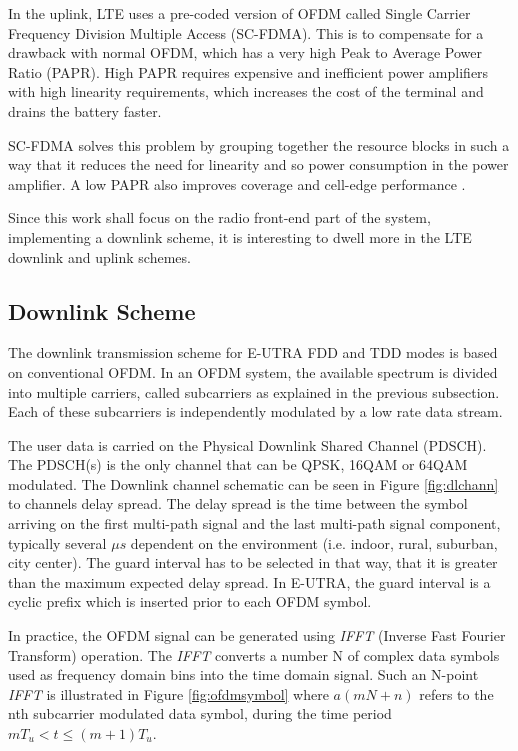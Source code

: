 
In the uplink, LTE uses a pre-coded version of OFDM called Single Carrier Frequency
Division Multiple Access (SC-FDMA). This is to compensate for a drawback with normal
OFDM, which has a very high Peak to Average Power Ratio (PAPR). High PAPR requires
expensive and inefficient power amplifiers with high linearity requirements, which
increases the cost of the terminal and drains the battery faster.

SC-FDMA solves this problem by grouping together the resource blocks in such a
way that it reduces the need for linearity and so power consumption in the
power amplifier. A low PAPR also improves coverage and cell-edge performance
\cite{introlte}.

Since this work shall focus on the radio front-end part of the system, implementing
a downlink scheme, it is interesting to dwell more in the LTE downlink and uplink
schemes.

\subsection{Downlink Scheme}%

The downlink transmission scheme for E-UTRA FDD and TDD modes is based on
conventional OFDM. In an OFDM system, the available spectrum is divided into
multiple carriers, called subcarriers as explained in the previous subsection.
Each of these subcarriers is independently modulated by a low rate data stream.

The user data is carried on the Physical Downlink Shared Channel (PDSCH). The
PDSCH(s) is the only channel that can be QPSK, 16QAM or 64QAM modulated. The
Downlink channel schematic can be seen in Figure \ref{fig:dlchann} to channels
delay spread. The delay spread is the time between the symbol arriving on the
first multi-path signal and the last multi-path signal component, typically
several $\mu s$ dependent on the environment (i.e. indoor, rural, suburban, city
center). The guard interval has to be selected in that way, that it is greater
than the maximum expected delay spread. In E-UTRA, the guard interval is a
cyclic prefix which is inserted prior to each OFDM symbol.

In practice, the OFDM signal can be generated using \textit{IFFT} (Inverse Fast
Fourier Transform) operation. The \textit{IFFT} converts a number N of complex
data symbols used as frequency domain bins into the time domain signal. Such an
N-point \textit{IFFT} is illustrated in Figure \ref{fig:ofdmsymbol} where
$a(mN+n)$ refers to the nth subcarrier modulated data symbol, during the time
period $mT_u < t \le (m+1)T_u$.

